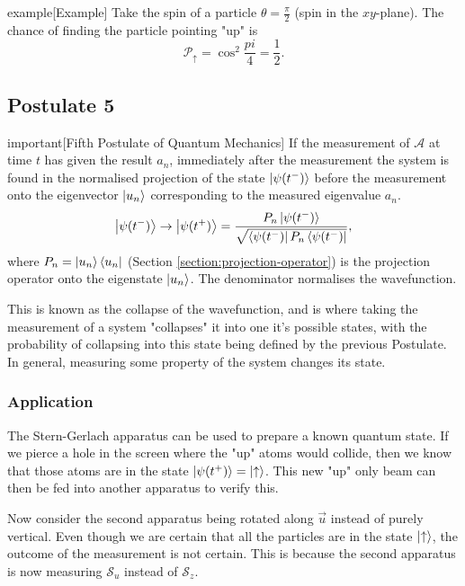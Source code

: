 \documentclass{article}
\begin{document}
\begin{callout}{example}[Example]
\label{example:s3-e1}
     Take the spin of a particle $\theta =\frac{\pi }{2}$ (spin in the $xy$-plane). The chance of finding the particle pointing "up" is
     \[
         \mathcal{P}_{\uparrow}=\cos^2 \frac{pi}{4}=\frac{1}{2}.
     \] 
\end{callout}

\subsection{Postulate 5}
\begin{callout*}{important}[Fifth Postulate of Quantum Mechanics]
\label{important:s3-p5}
    If the measurement of $\mathcal{A}$ at time $t$ has given the result $a_n$, immediately after the measurement the system is found in the normalised projection of the state $\ket{\psi (t^{-})}$ before the measurement onto the eigenvector $\ket{u_n}$ corresponding to the measured eigenvalue $a_n$.
    \[
        \ket{\psi (t^-)}\to \ket{\psi (t^+)}=\frac{P_n \ket{\psi (t^-)}}{\sqrt{\bra{\psi (t^-)}P_n \bra{\psi (t^-)}}},
    \]
    where $P_n=\ket{u_n}\bra{u_n}$ (Section \ref{section:projection-operator}) is the projection operator onto the eigenstate $\ket{u_n}$. The denominator normalises the wavefunction.
\end{callout*}

This is known as the collapse of the wavefunction, and is where taking the measurement of a system "collapses" it into one it's possible states, with the probability of collapsing into this state being defined by the previous Postulate. In general, measuring some property of the system changes its state.

\subsubsection{Application}
The Stern-Gerlach apparatus can be used to prepare a known quantum state. If we pierce a hole in the screen where the "up" atoms would collide, then we know that those atoms are in the state $\ket{\psi (t^+)}=\ket{\uparrow}$. This new "up" only beam can then be fed into another apparatus to verify this.

Now consider the second apparatus being rotated along $\vec{u}$ instead of purely vertical. Even though we are certain that all the particles are in the state $\ket{\uparrow}$, the outcome of the measurement is not certain. This is because the second apparatus is now measuring $\mathcal{S}_u$ instead of $\mathcal{S}_z$.
\end{document}
